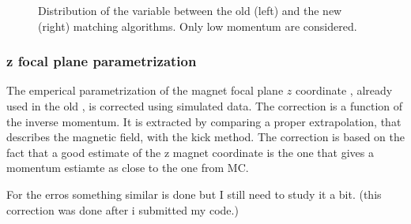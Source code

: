 \begin{figure}[t]
  \centering
  \begin{subfigure}{0.5\textwidth}
    \scalebox{.6}{}
    \caption{}
    \label{mvTTm_chi2}
  \end{subfigure}%
  \hfill%
  \begin{subfigure}{0.5\textwidth}
    \scalebox{.6}{}
    \caption{}
    \label{mvm_chi2}
  \end{subfigure}
  \caption{Distribution of the \chisq variable between the old (left) and the new (right) matching algorithms.
           Only low momentum \veloTracks are considered.}
 \label{mvm_chi2_comp}
\end{figure}

\subsubsection{z focal plane parametrization}
The emperical parametrization of the magnet focal plane $z$ coordinate \cite{blah}, already used in  the old \mvm,
is corrected using simulated data. The correction is a function of the inverse momentum. It is extracted by comparing
a proper extrapolation, that describes the magnetic field, with the kick method. The correction is based on the fact
that a good estimate of the z magnet coordinate is the one that gives a momentum estiamte as close to the one from MC.

For the erros something similar is done but I still need to study it a bit. (this correction was done after i submitted my code.)

